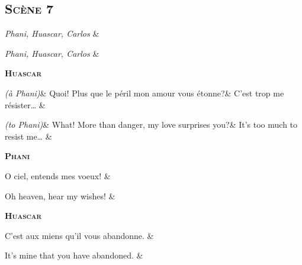 \documentclass{article}
\newcommand{\dialogue}[1]{%
\filbreak\begin{center}
	\textbf{\textsc{#1}}
\end{center}\nopagebreak}
\newcommand{\stage}[1]{\hfill\emph{(#1)}\hfill}
\newcommand{\scene}[1]{\emph{#1}\hfill}
\begin{document}

\subsection*{\textsc{Sc\`{e}ne 7}}

\begin{pairs}
\begin{Leftside}
	\stanza
		\scene{Phani, Huascar, Carlos}
    \& 
    \endnumbering
\end{Leftside}
\begin{Rightside}
	\stanza
		\scene{Phani, Huascar, Carlos}
    \& 
    \endnumbering
\end{Rightside} 
\Columns 
\end{pairs}

\dialogue{Huascar}
\begin{pairs}
\begin{Leftside}
	\stanza
		\stage{\`{a} Phani}&
		Quoi! Plus que le p\'{e}ril mon amour vous \'{e}tonne?&
		C'est trop me r\'{e}sister\ldots{}
    \& 
    \endnumbering
\end{Leftside}
\begin{Rightside}
	\stanza
		\stage{to Phani}&
		What! More than danger, my love surprises you?&
		It's too much to resist me\ldots{}
    \& 
    \endnumbering
\end{Rightside} 
\Columns 
\end{pairs}

\dialogue{Phani}
\begin{pairs}
\begin{Leftside}
	\stanza
		O ciel, entends mes voeux!
    \& 
    \endnumbering
\end{Leftside}
\begin{Rightside}
	\stanza
		Oh heaven, hear my wishes!
    \& 
    \endnumbering
\end{Rightside} 
\Columns 
\end{pairs}

\dialogue{Huascar}
\begin{pairs}
\begin{Leftside}
	\stanza
		C'est aux miens qu'il vous abandonne.
    \& 
    \endnumbering
\end{Leftside}
\begin{Rightside}
	\stanza
		It's mine that you have abandoned.
    \& 
    \endnumbering
\end{Rightside} 
\Columns 
\end{pairs}
\end{document}
